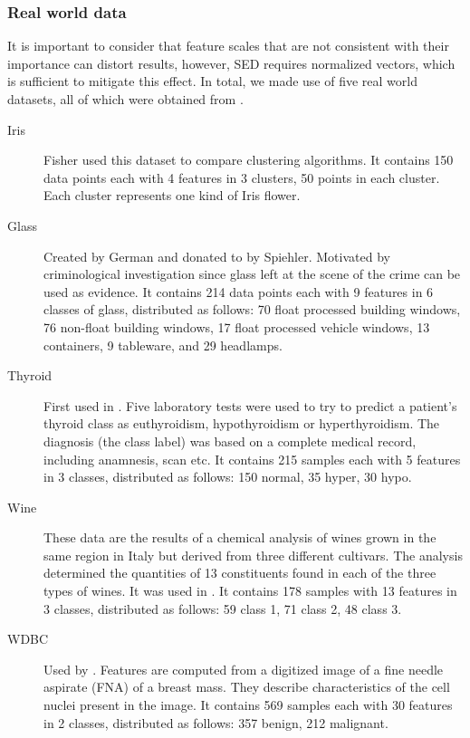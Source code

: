 \subsubsection{Real world data}  It is important to consider that feature scales that are not consistent with their importance can distort results, however, SED requires normalized vectors, which is sufficient to mitigate this effect.  In total, we made use of five real world datasets, all of which were obtained from \cite{Bache:2013}.
\begin{description}
\item[Iris] Fisher \cite{fisher:1936} used this dataset to compare clustering algorithms.  It contains 150 data points each with 4 features in 3 clusters, 50 points in each cluster.  Each cluster represents one kind of Iris flower.
\item[Glass] Created by German and donated to \cite{Bache:2013} by Spiehler.  Motivated by criminological investigation since glass left at the scene of the crime can be used as evidence. It contains 214 data points each with 9 features in 6 classes of glass, distributed as follows: 70 float processed building windows, 76 non-float building windows, 17 float processed vehicle windows, 13 containers, 9 tableware, and 29 headlamps.
\item[Thyroid] First used in \cite{Coomans:1983}.  Five laboratory tests were used to try to predict a patient's thyroid class as euthyroidism, hypothyroidism or hyperthyroidism. The diagnosis (the class label) was based on a complete medical record, including anamnesis, scan etc. It contains 215 samples each with 5 features in 3 classes, distributed as follows: 150 normal, 35 hyper, 30 hypo.
\item[Wine] These data are the results of a chemical analysis of wines grown in the same region in Italy but derived from three different cultivars.  The analysis determined the quantities of 13 constituents found in each of the three types of wines. It was used in \cite{Aeberhard:1992}.  It contains 178 samples with 13 features in 3 classes, distributed as follows:
59 class 1,
71 class 2,
48 class 3.
\item[WDBC] Used by \cite{Mangasarian:1995}. Features are computed from a digitized image of a fine needle aspirate (FNA) of a breast mass.  They describe characteristics of the cell nuclei present in the image. It contains 569 samples each with 30 features in 2 classes, distributed as follows: 
357 benign, 
212 malignant.
\end{description}
